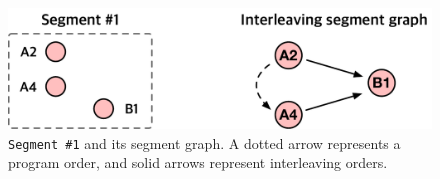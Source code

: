 \begin{figure}[t]
  \centering
  \includegraphics[width=0.9\linewidth]{fig/interleavingsegmentgraph.pdf}
  \caption{\texttt{Segment \#1} and its segment graph. A
    dotted arrow represents a program order, and solid arrows
    represent interleaving orders.}
  \label{fig:interleavingsegmentgraph}
\end{figure}

%


%



